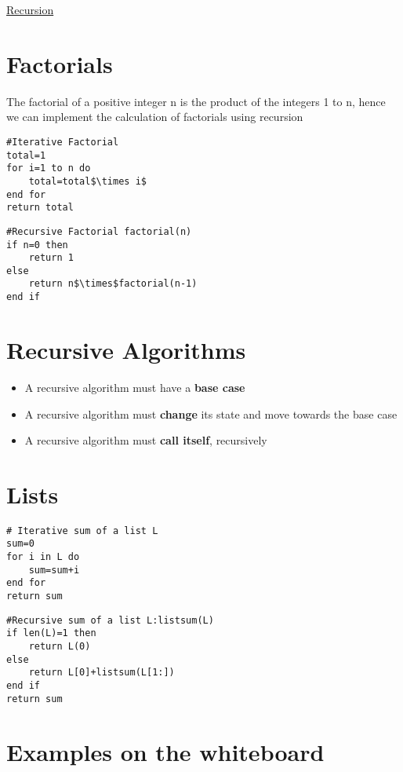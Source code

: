 \documentclass{article}[18pt]
\begin{document}
\begin{center}
\underline{\huge Recursion}
\end{center}
\section{Factorials}
The factorial of a positive integer n is the product of the integers 1 to n, hence we can implement the calculation of factorials using recursion
\begin{lstlisting}[mathescape=true]
#Iterative Factorial
total=1
for i=1 to n do
	total=total$\times i$
end for
return total
\end{lstlisting}
\begin{lstlisting}[mathescape=true]
#Recursive Factorial factorial(n)
if n=0 then
	return 1
else
	return n$\times$factorial(n-1)
end if
\end{lstlisting}
\section{Recursive Algorithms}
\begin{itemize}
\item A recursive algorithm must have a \textbf{base case}
\item A recursive algorithm must \textbf{change} its state and move towards the base case
\item A recursive algorithm must \textbf{call itself}, recursively 
\end{itemize}
\section{Lists}
\begin{lstlisting}[mathescape=true]
# Iterative sum of a list L
sum=0
for i in L do
	sum=sum+i
end for
return sum
\end{lstlisting}
\begin{lstlisting}[mathescape=true]
#Recursive sum of a list L:listsum(L)
if len(L)=1 then
	return L(0)
else
	return L[0]+listsum(L[1:])
end if
return sum
\end{lstlisting}
\section{Examples on the whiteboard}
\end{document}
